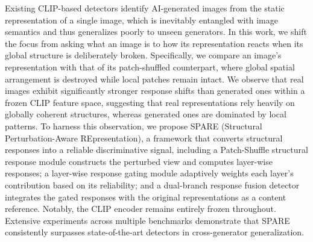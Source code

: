 Existing CLIP-based detectors identify AI-generated images from the static representation of a single image, which is inevitably entangled with image semantics and thus generalizes poorly to unseen generators. In this work, we shift the focus from asking what an image is to how its representation reacts when its global structure is deliberately broken. Specifically, we compare an image's representation with that of its patch-shuffled counterpart, where global spatial arrangement is destroyed while local patches remain intact. We observe that real images exhibit significantly stronger response shifts than generated ones within a frozen CLIP feature space, suggesting that real representations rely heavily on globally coherent structures, whereas generated ones are dominated by local patterns. To harness this observation, we propose SPARE (Structural Perturbation-Aware REpresentation), a framework that converts structural responses into a reliable discriminative signal, including a Patch-Shuffle structural response module constructs the perturbed view and computes layer-wise responses; a layer-wise response gating module adaptively weights each layer's contribution based on its reliability; and a dual-branch response fusion detector integrates the gated responses with the original representations as a content reference. Notably, the CLIP encoder remains entirely frozen throughout. Extensive experiments across multiple benchmarks demonstrate that SPARE consistently surpasses state-of-the-art detectors in cross-generator generalization.